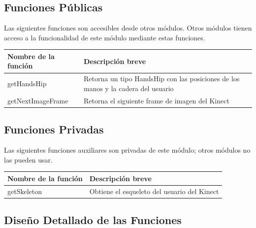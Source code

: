 \documentclass[a4paper,12pt]{article}
\begin{document}
\subsection{Funciones Públicas}
Las siguientes funciones son accesibles desde otros módulos. Otros módulos
tienen acceso a la funcionalidad de este módulo mediante estas funciones.
~\\

\begin{tabular}{| p{30mm} | p{10cm} |}
        \hline
        \textbf{Nombre de la \mbox{función}} & \textbf{Descripción breve} \\
        \hline
        getHandsHip & Retorna un tipo HandsHip con las posiciones de los manos y
        la cadera del usuario \\
        \hline
        getNextImageFrame & Retorna el siguiente frame de imagen del Kinect \\
        \hline
\end{tabular}
\subsection{Funciones Privadas}
Las siguientes funciones auxiliares son privadas de este módulo; otros módulos
no las pueden usar.~\\

\begin{tabular}{| p{30mm} | p{10cm} |}
        \hline
        \textbf{Nombre de la \mbox{función}} & \textbf{Descripción breve} \\
        \hline
        getSkeleton & Obtiene el esqueleto del usuario del Kinect \\
        \hline
\end{tabular}
\subsection{Diseño Detallado de las Funciones}
\end{document}
